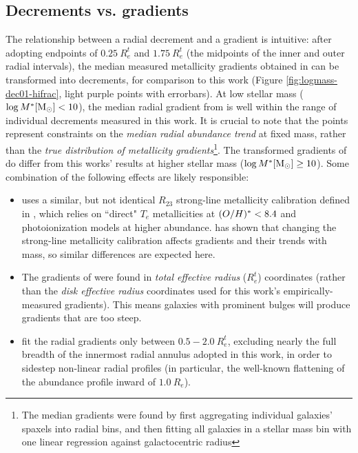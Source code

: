 \subsection{Decrements vs. gradients}
The relationship between a radial decrement and a gradient is intuitive: after adopting endpoints of $0.25 ~ R_e^t$ and $1.75 ~ R_e^t$ (the midpoints of the inner and outer radial intervals), the median measured metallicity gradients obtained in \citet[a recent study using MaNGA data]{mingozzi_2020} can be transformed into decrements, for comparison to this work (Figure \ref{fig:logmass-dec01-hifrac}, light purple points with errorbars). At low stellar mass ($\log M^* {\rm [M_{\odot}]} < 10$), the median radial gradient from \citet{mingozzi_2020} is well within the range of individual decrements measured in this work. It is crucial to note that the \citet{mingozzi_2020} points represent constraints on the \emph{median radial abundance trend} at fixed mass, rather than the \emph{true distribution of metallicity gradients}\footnote{The \citet{mingozzi_2020} median gradients were found by first aggregating individual galaxies' spaxels into radial bins, and then fitting all galaxies in a stellar mass bin with one linear regression against galactocentric radius}. The transformed gradients of \citep{mingozzi_2020} do differ from this works' results at higher stellar mass ($\log M^* {\rm [M_{\odot}]} \ge 10$). Some combination of the following effects are likely responsible:
%
\begin{itemize}
    \item \citet{mingozzi_2020} uses a similar, but not identical $R_{23}$ strong-line metallicity calibration defined in \citet[Table 4]{maiolino_nagao_2008}, which relies on ``direct" $T_e$ metallicities at $(O/H)^* < 8.4$ and photoionization models at higher abundance. \citet{belfiore_2017_manga-metgrad} has shown that changing the strong-line metallicity calibration affects gradients and their trends with mass, so similar differences are expected here.
    \item The gradients of \citet{mingozzi_2020} were found in \emph{total effective radius} ($R_e^t$) coordinates (rather than the \emph{disk effective radius} coordinates used for this work's empirically-measured gradients). This means galaxies with prominent bulges will produce gradients that are too steep. 
    \item \citet{mingozzi_2020} fit the radial gradients only between $0.5-2.0 ~ R_e^t$, excluding nearly the full breadth of the innermost radial annulus adopted in this work, in order to sidestep non-linear radial profiles (in particular, the well-known flattening of the abundance profile inward of $1.0 ~ R_e$).
\end{itemize}
%

